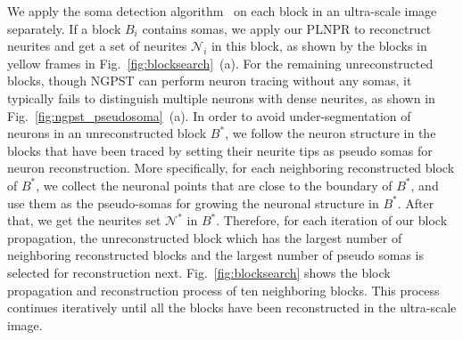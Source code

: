  
We apply the soma detection algorithm~\cite{Quan2013} on each block in an ultra-scale image separately. 
If a block $B_{i}$ contains somas, we apply our PLNPR to reconctruct neurites and get a set of neurites $\mathcal{N}_{i}$ in this block, as shown by the blocks in yellow frames in Fig.~\ref{fig:blocksearch}~(a).
%
For the remaining unreconstructed blocks, though NGPST can perform neuron tracing without any somas, it typically fails to distinguish multiple neurons with dense neurites, as shown in Fig.~\ref{fig:ngpst_pseudosoma}~(a).
In order to avoid under-segmentation of neurons in an unreconstructed block $B^*$, we follow the neuron structure in the blocks that have been traced by setting their neurite tips as pseudo somas for neuron reconstruction.
%
More specifically, for each neighboring reconstructed block of $B^*$, we collect the neuronal points that are close to the boundary of $B^*$, and use them as the pseudo-somas for growing the neuronal structure in $B^*$. After that, we get the neurites set $ \mathcal{N}^*$ in $B^*$.
%
Therefore, for each iteration of our block propagation, the unreconstructed block which has the largest number of neighboring reconstructed blocks and the largest number of pseudo somas is selected for reconstruction next.
%
Fig.~\ref{fig:blocksearch} shows the block propagation and reconstruction process of ten neighboring blocks. 
%
This process continues iteratively until all the blocks have been reconstructed in the ultra-scale image. 
%

